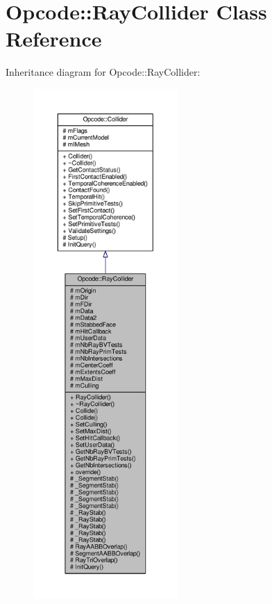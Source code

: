 \hypertarget{classOpcode_1_1RayCollider}{}\section{Opcode\+:\+:Ray\+Collider Class Reference}
\label{classOpcode_1_1RayCollider}


Inheritance diagram for Opcode\+:\+:Ray\+Collider\+:
\nopagebreak
\begin{figure}[H]
\begin{center}
\leavevmode
\includegraphics[height=550pt]{d1/d1c/classOpcode_1_1RayCollider__inherit__graph}
\end{center}
\end{figure}


